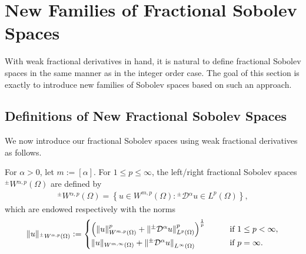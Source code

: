 \documentclass[leqno,final]{siamltex}
\numberwithin{equation}{section}
\renewcommand{\(}{\bigl(}
\renewcommand{\)}{\bigr)}
\begin{document}
\section{New Families of Fractional Sobolev Spaces}\label{sec-3}
With weak fractional derivatives in hand, it is natural 
to define fractional Sobolev spaces in the same manner as in the integer order case. 
The goal of this section is exactly to introduce new families of Sobolev spaces
based on such an approach.
 

\subsection{Definitions of New Fractional Sobolev Spaces}\label{sec-3.1}
We now introduce our fractional Sobolev spaces using weak fractional derivatives as follows. 

    \begin{definition}
       For $\alpha>0$, let $m :=[\alpha]$. For $1 \leq p \leq \infty$,  the left/right fractional Sobolev spaces ${^{\pm}}{W}{^{ \alpha , p}} (\Omega)$ are defined by  
        \begin{align} \label{FSS}
             {^{\pm}}{W}{^{ \alpha , p}} (\Omega) = \left\{ u \in W^{m,p}(\Omega): 
             {^{\pm}}{\mathcal{D}}{^{\alpha}}   u \in L^{p}(\Omega) \right\},
        \end{align}
        which are endowed respectively with the norms 
        \begin{align} \label{FSS_norm}
          \|u\|_{{^{\pm}}{W}{^{\alpha , p}}(\Omega)}:= \begin{cases}
          \Bigl(\left\|u\right\|_{W^{m,p}(\Omega)}^{p} + \left\|{^{\pm}}{\mathcal{D}}{^{\alpha}}  u \right\|_{L^{p}(\Omega)}^{p} \Bigr)^{\frac{1}{p}} &\qquad \text{if } 1 \leq p < \infty,\\
          \|u\|_{W^{m,\infty}(\Omega)} 
          + \left\|{^{\pm}}{\mathcal{D}}{^{\alpha}}  u \right\|_{L^{\infty}(\Omega)} &\qquad \text{if } p = \infty.
          \end{cases} 
        \end{align}

    \end{definition}
\end{document}
